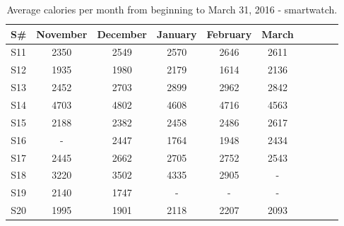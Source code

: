 \documentclass[12pt]{article} %
\begin{document}
\begin{table}[H]
\center
\begin{footnotesize}
	\begin{tabular}{| c | c | c | c | c | c | c | c | c | c |}
	\hline
	\textbf{S\#} & \textbf{November} & \textbf{December} & \textbf{January} & \textbf{February} & \textbf{March} \\
	
	\hline
	S11 & 2350 & 2549 & 2570 & 2646 & 2611\\
	\hline
	S12 & 1935 & 1980 & 2179 & 1614 & 2136\\
	\hline
	S13 & 2452 & 2703 & 2899 & 2962 & 2842\\
	\hline
	S14 & 4703 & 4802 & 4608 & 4716 & 4563\\
	\hline
	S15 & 2188 & 2382 & 2458 & 2486 & 2617\\
	\hline
	S16 & - & 2447 & 1764 & 1948 & 2434\\
	\hline
	S17 & 2445 & 2662 & 2705 & 2752 & 2543\\
	\hline
	S18 & 3220 & 3502 & 4335 & 2905 & - \\
	\hline
	S19 & 2140 & 1747 & - & - & -\\
	\hline
	S20 & 1995 & 1901 & 2118 & 2207 & 2093\\
	\hline
	\end{tabular}
	\caption{Average calories per month from beginning to March 31, 2016 - smartwatch.}
	\label{tab:caloriesWatch}
\end{footnotesize}
\end{table}
\end{document}
